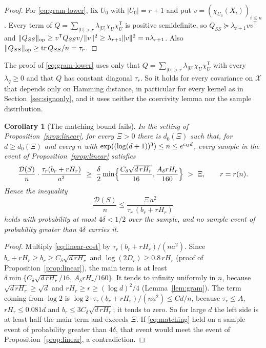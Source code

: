 \documentclass[11pt]{article}
\newtheorem{corollary}[theorem]{Corollary}
\theoremstyle{definition}\newtheorem{assumption}[theorem]{Assumption}
\theoremstyle{remark}\newtheorem{remark}[theorem]{Remark}
\newcommand{\X}{\mathcal X}
\begin{document}
\begin{proof}
For \eqref{eq:gram-lower}, fix $U_0$ with $|U_0|=r+1$ and put
$v=(\chi_{U_0}(X_i))_{i\le n}$. Every term of
$Q=\sum_{|U|>r}\lambda_{|U|}\chi_U\chi_U^{\mathsf T}$ is positive
semidefinite, so $Q_{SS}\succeq\lambda_{r+1}vv^{\mathsf T}$ and
$\|Q_{SS}\|_{\rm op}\ge v^{\mathsf T}Q_{SS}v/\|v\|^2\ge\lambda_{r+1}\|v\|^2
=n\lambda_{r+1}$. Also $\|Q_{SS}\|_{\rm op}\ge\operatorname{tr}Q_{SS}/n=\tau_r$.
\end{proof}

The proof of \eqref{eq:gram-lower} uses only that
$Q=\sum_{|U|>r}\lambda_{|U|}\chi_U\chi_U^{\mathsf T}$ with every
$\lambda_q\ge0$ and that $Q$ has constant diagonal $\tau_r$. So it holds
for every covariance on $\X$ that depends only on Hamming distance, in
particular for every kernel as in Section~\ref{sec:signonly}, and it uses
neither the coercivity lemma nor the sample distribution.

\begin{corollary}[The matching bound fails]\label{cor:matching}
In the setting of Proposition~\ref{prop:linear}, for every $\Xi>0$ there is
$d_0(\Xi)$ such that, for $d\ge d_0(\Xi)$ and every $n$ with
$\exp((\log(d+1))^3)\le n\le e^{c_{\rm G}d}$, every sample in the event of
Proposition~\ref{prop:linear} satisfies
\[
 \frac{\mathcal D(S)}n\cdot\frac{\tau_r(b_r+rH_r)}{a^2}\ \ge\
 \frac\delta2\min\Bigl\{\frac{C_\delta\sqrt{d\,rH_r}}{16},
 \frac{A_\delta rH_r}{160}\Bigr\}\ >\ \Xi,\qquad r=r(n).
\]
Hence the inequality
\begin{equation}\label{eq:matching}
 \frac{\mathcal D(S)}n\le\frac{\Xi\,a^2}{\tau_r\,(b_r+rH_r)}
\end{equation}
holds with probability at most $4\delta<1/2$ over the sample, and no
sample event of probability greater than $4\delta$ carries it.
\end{corollary}
\begin{proof}
Multiply \eqref{eq:linear-cost} by $\tau_r(b_r+rH_r)/(na^2)$. Since
$b_r+rH_r\ge b_r\ge C_\delta\sqrt{d\,rH_r}$ and $\log(2D_r)\ge0.8\,rH_r$
(proof of Proposition~\ref{prop:linear}), the main term is at least
$\delta\min\{C_\delta\sqrt{d\,rH_r}/16,\,A_\delta rH_r/160\}$. It tends to
infinity uniformly in $n$, because $\sqrt{d\,rH_r}\ge\sqrt d$ and
$rH_r\ge r\ge(\log d)^2/4$ (Lemma~\ref{lem:gram}). The term coming from
$\log2$ is $\log2\cdot\tau_r(b_r+rH_r)/(na^2)\le Cd/n$, because
$\tau_r\le A$, $rH_r\le0.081d$ and $b_r\le3C_\delta\sqrt{d\,rH_r}$; it tends
to zero. So for large $d$ the left side is at least half the main term and
exceeds $\Xi$. If \eqref{eq:matching} held on a sample event of probability
greater than $4\delta$, that event would meet the event of
Proposition~\ref{prop:linear}, a contradiction.
\end{proof}
\end{document}
